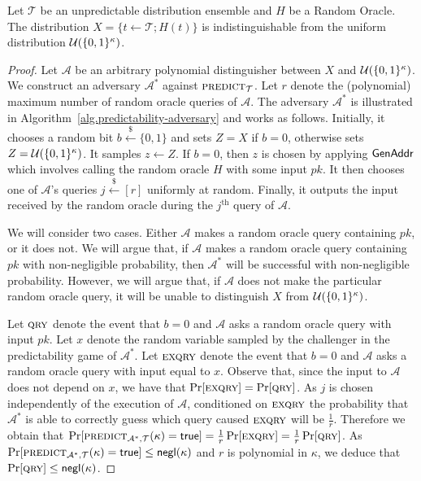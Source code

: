 \begin{lemma}\label{lem:ro-unpredictability}
  Let $\mathcal{T}$ be an unpredictable distribution ensemble and $H$ be a
  Random Oracle.
  The distribution $X = \{t \gets \mathcal{T}; H(t)\}$ is indistinguishable from
  the uniform distribution $\mathcal{U}(\{0,1\}^\kappa)$.
\end{lemma}
\begin{proof}
  Let $\mathcal{A}$ be an arbitrary polynomial distinguisher between
  $X$ and $\mathcal{U}(\{0, 1\}^\kappa)$.
  We construct an adversary $\mathcal{A}^*$
  against $\textsc{predict}_{\mathcal{T}}$.
  Let $r$ denote the (polynomial)
  maximum number of random oracle queries of $\mathcal{A}$.
  The adversary $\mathcal{A}^*$ is illustrated in
  Algorithm~\ref{alg.predictability-adversary} and works as follows.
  Initially, it chooses a random bit $b \stackrel{\$}{\gets} \{0, 1\}$ and
  sets $Z = X$ if $b = 0$, otherwise
  sets $Z = \mathcal{U}(\{0,1\}^\kappa)$.
  It samples $z \gets Z$.
  If $b = 0$, then $z$ is chosen by applying $\mathsf{GenAddr}$ which involves
  calling the random oracle $H$ with some input $pk$.
  It then chooses one of $\mathcal{A}$'s queries $j \stackrel{\$}{\gets} [r]$
  uniformly at random. Finally, it outputs the input received by the random
  oracle during the $j^\text{th}$ query of $\mathcal{A}$.

  We will consider two cases. Either $\mathcal{A}$ makes a random oracle query
  containing $pk$, or it does not. We will argue that, if $\mathcal{A}$ makes
  a random oracle query containing $pk$ with non-negligible probability, then
  $\mathcal{A}^*$ will be successful with non-negligible probability. However,
  we will argue that, if $\mathcal{A}$ does not make the particular random
  oracle query, it will be unable to distinguish $X$ from $\mathcal{U}(\{0,1\}^\kappa)$.

  Let $\textsc{qry}$ denote the event that $b = 0$ and $\mathcal{A}$ asks a random
  oracle query with input $pk$.
  Let $x$ denote the random variable sampled by the challenger in the
  predictability game of $\mathcal{A}^*$.
  Let $\textsc{exqry}$ denote the event that $b = 0$ and $\mathcal{A}$ asks a
  random oracle query with input equal to $x$. Observe that, since the input to
  $\mathcal{A}$ does not depend on $x$, we have that
  $\Pr[\textsc{exqry}] = \Pr[\textsc{qry}]$. As $j$ is chosen independently of the execution
  of $\mathcal{A}$, conditioned on $\textsc{exqry}$ the probability that
  $\mathcal{A}^*$ is able to correctly guess which query caused $\textsc{exqry}$ will
  be $\frac{1}{r}$. Therefore we obtain that
  $\Pr[\textsc{predict}_{\mathcal{A}^*,\mathcal{T}}(\kappa) = \mathsf{true}]
   = \frac{1}{r}\Pr[\textsc{exqry}]
   = \frac{1}{r}\Pr[\textsc{qry}]$.
  As
  $\Pr[\textsc{predict}_{\mathcal{A}^*,\mathcal{T}}(\kappa) = \mathsf{true}] \leq \textsf{negl}(\kappa)$
  and $r$
  is polynomial in $\kappa$, we deduce that $\Pr[\textsc{qry}] \leq \textsf{negl}(\kappa)$.


\end{proof}
